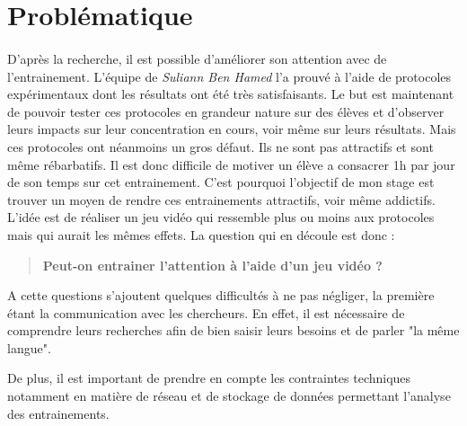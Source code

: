 \section{Problématique}

\paragraph{}D'après la recherche, il est possible d'améliorer son attention avec de l'entrainement. L'équipe de \emph{Suliann Ben Hamed} l'a prouvé à l'aide de protocoles expérimentaux
dont les résultats ont été très satisfaisants. Le but est maintenant de pouvoir tester ces protocoles en grandeur nature sur des élèves et d'observer leurs impacts sur leur
concentration en cours, voir même sur leurs résultats. Mais ces protocoles ont néanmoins un gros défaut. Ils ne sont pas attractifs et sont même rébarbatifs. Il est donc difficile de
motiver un élève a consacrer 1h par jour de son temps sur cet entrainement. C'est pourquoi l'objectif de mon stage est trouver un moyen de rendre ces entrainements attractifs, voir
même addictifs. L'idée est de réaliser un jeu vidéo qui ressemble plus ou moins aux protocoles mais qui aurait les mêmes effets. La question qui en découle est donc :
\begin{quote}
\textbf{Peut-on entrainer l'attention à l'aide d'un jeu vidéo ?}
\end{quote}

A cette questions s'ajoutent quelques difficultés à ne pas négliger, la première étant la communication avec les chercheurs. En effet, il est nécessaire de comprendre leurs
recherches afin de bien saisir leurs besoins et de parler "la même langue".

De plus, il est important de prendre en compte les contraintes techniques notamment en matière de réseau et de stockage de données permettant l'analyse des entrainements.


\newpage